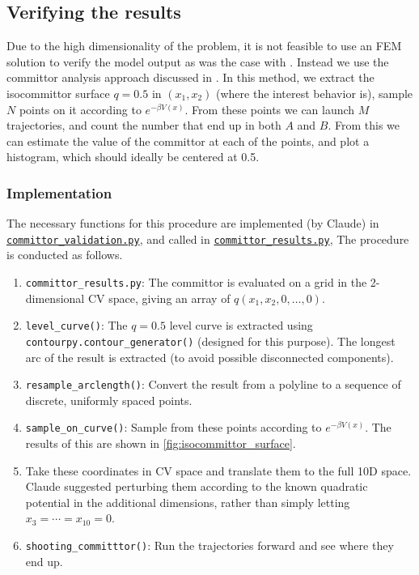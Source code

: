 \documentclass[12pt]{article}
\theoremstyle{ColorTheorem}
\numberwithin{theorem}{section}
\numberwithin{corollary}{section}
\theoremstyle{ColorDefinition}
\theoremstyle{definition}
\theoremstyle{ColorRemark}
\numberwithin{equation}{section}
\begin{document}
\subsection{Verifying the results}
Due to the high dimensionality of the problem,
it is not feasible to use an FEM solution to verify the model output as was the case with \cite{face_nn_deltanet}.
Instead we use the committor analysis approach discussed in \cite{li2019,project2}.
In this method, we extract the isocommittor surface \(q = 0.5\) in \((x_1, x_2)\) (where the interest behavior is),
sample \(N\) points on it according to \(e^{-\beta V(x)}\).
From these points we can launch \(M\) trajectories, and count the number that end up in both \(A\) and \(B\).
From this we can estimate the value of the committor at each of the points,
and plot a histogram, which should ideally be centered at 0.5.

\subsubsection{Implementation}
The necessary functions for this procedure are implemented (by Claude) in 
\href{https://github.com/jrippeon/amsc665project2/blob/main/src/committor/committor_validation.py}{\texttt{committor\_validation.py}},
and called in
\href{https://github.com/jrippeon/amsc665project2/blob/main/src/committor/committor_results.py}{\texttt{committor\_results.py}},
The procedure is conducted as follows.
\begin{enumerate}
  \item \texttt{committor\_results.py}:
  The committor is evaluated on a grid in the 2-dimensional CV space,
  giving an array of \(q(x_1, x_2, 0, \dotsc, 0)\).
  \item \texttt{level\_curve()}: 
  The \(q = 0.5\) level curve is extracted using \texttt{contourpy.contour\_generator()} (designed for this purpose).
  The longest arc of the result is extracted (to avoid possible disconnected components).
  \item \texttt{resample\_arclength()}: 
  Convert the result from a polyline to a sequence of discrete,
  uniformly spaced points.
  \item \texttt{sample\_on\_curve()}:
  Sample from these points according to \(e^{-\beta V(x)}\).
  The results of this are shown in \autoref{fig:isocommittor_surface}.
  \item Take these coordinates in CV space and translate them to the full 10D space.
  Claude suggested perturbing them according to the known quadratic potential in the additional dimensions,
  rather than simply letting \(x_3 = \dotsb = x_{10} = 0\).
  \item \texttt{shooting\_committtor()}: Run the trajectories forward and see where they end up.
\end{enumerate}
\end{document}
